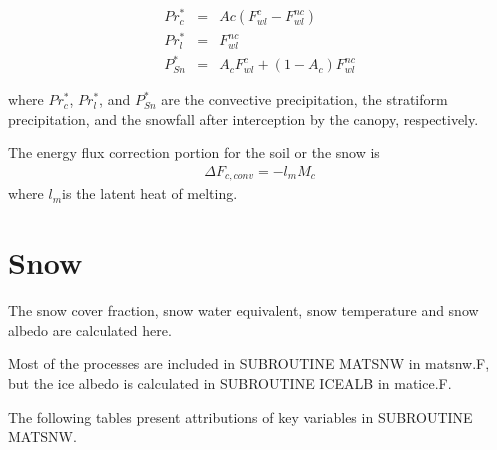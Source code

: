 \begin{eqnarray}
 Pr_c^\ast &=& Ac ( F_{wl}^{c} - F_{wl}^{nc} ) \\
 Pr_l^\ast &=& F_{wl}^{nc} \\
 P_{Sn}^\ast &=& A_c F_{wl}^{c} + (1-A_c) F_{wl}^{nc}
\end{eqnarray}

where \(Pr_c^*\), \(Pr_l^*\), and \(P_{Sn}^*\) are the convective precipitation, the stratiform precipitation, and the snowfall after interception by the canopy, respectively.

The energy flux correction portion for the soil or the snow is \begin{eqnarray}
 \Delta F_{c,conv} = - l_m M_c
\end{eqnarray} where \(l_m\)is the latent heat of melting.

\section{Snow}\label{snow}

The snow cover fraction, snow water equivalent, snow temperature and snow albedo are calculated here.

Most of the processes are included in SUBROUTINE MATSNW in matsnw.F, but the ice albedo is calculated in SUBROUTINE ICEALB in matice.F.

The following tables present attributions of key variables in SUBROUTINE MATSNW.

